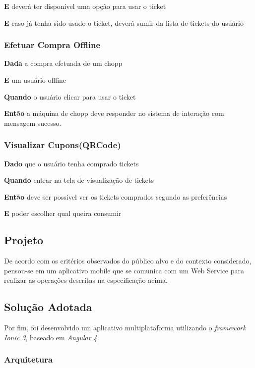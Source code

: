 \textbf{E} deverá ter disponível uma opção para usar o ticket

\textbf{E} caso já tenha sido usado o ticket, deverá sumir da lista de tickets do usuário

\subsubsection{Efetuar Compra Offline}

\textbf{Dada} a compra efetuada de um chopp

\textbf{E} um usuário offline

\textbf{Quando} o usuário clicar para usar o ticket

\textbf{Então} a máquina de chopp deve responder no sistema de interação com mensagem sucesso.

\subsubsection{Visualizar Cupons(QRCode)}

\textbf{Dado} que o usuário tenha comprado tickets

\textbf{Quando} entrar na tela de visualização de tickets

\textbf{Então} deve ser possível ver os tickets comprados segundo as preferências

\textbf{E} poder escolher qual queira consumir

\subsection{Projeto}

De acordo com os critérios observados do público alvo e do contexto considerado, pensou-se em um aplicativo mobile que se comunica com um Web Service para realizar as operações descritas na especificação acima.

\subsection{Solução Adotada}

Por fim, foi desenvolvido um aplicativo multiplataforma utilizando o \textit{framework Ionic 3}, baseado em \textit{Angular 4}.

\subsubsection{Arquitetura}

